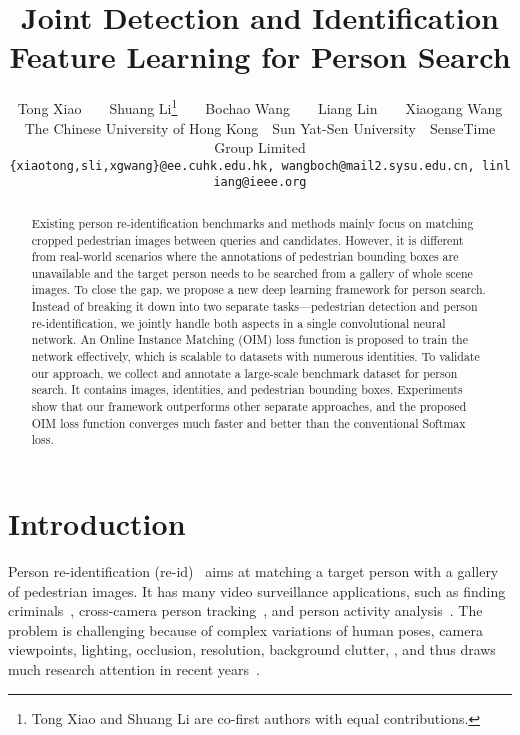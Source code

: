\documentclass[10pt,twocolumn,letterpaper]{article}
\begin{document}
\title{Joint Detection and Identification Feature Learning for Person Search}

\author{Tong Xiao\ \ \ \ Shuang Li\thanks{Tong Xiao and Shuang Li are co-first authors with equal contributions.}\ \ \ \ Bochao Wang\ \ \ \ Liang Lin\ \ \ \ Xiaogang Wang\\
\small The Chinese University of Hong Kong~~\small Sun Yat-Sen University~~\small SenseTime Group Limited\\
{\tt\small \{xiaotong,sli,xgwang\}@ee.cuhk.edu.hk,\ wangboch@mail2.sysu.edu.cn,\ linliang@ieee.org}
}

\maketitle
\thispagestyle{empty}

\begin{abstract}
Existing person re-identification benchmarks and methods mainly focus on matching cropped pedestrian images between queries and candidates. However, it is different from real-world scenarios where the annotations of pedestrian bounding boxes are unavailable and the target person needs to be searched from a gallery of whole scene images. To close the gap, we propose a new deep learning framework for person search. Instead of breaking it down into two separate tasks---pedestrian detection and person re-identification, we jointly handle both aspects in a single convolutional neural network. An Online Instance Matching (OIM) loss function is proposed to train the network effectively, which is scalable to datasets with numerous identities. To validate our approach, we collect and annotate a large-scale benchmark dataset for person search. It contains  images,  identities, and  pedestrian bounding boxes. Experiments show that our framework outperforms other separate approaches, and the proposed OIM loss function converges much faster and better than the conventional Softmax loss.
\end{abstract}

\section{Introduction} \label{sec:introduction}
Person re-identification (re-id)~\cite{zajdel2005keeping,gheissari2006person} aims at matching a target person with a gallery of pedestrian images. It has many video surveillance applications, such as finding criminals~\cite{wang2013intelligent}, cross-camera person tracking~\cite{yu2013harry}, and person activity analysis~\cite{loy2009multi}. The problem is challenging because of complex variations of human poses, camera viewpoints, lighting, occlusion, resolution, background clutter, \etc, and thus draws much research attention in recent years~\cite{zheng2015scalable,liao2015person,paisitkriangkrai2015learning,xiao2016learning,li2014deepreid,chu2016structured}.
\end{document}
